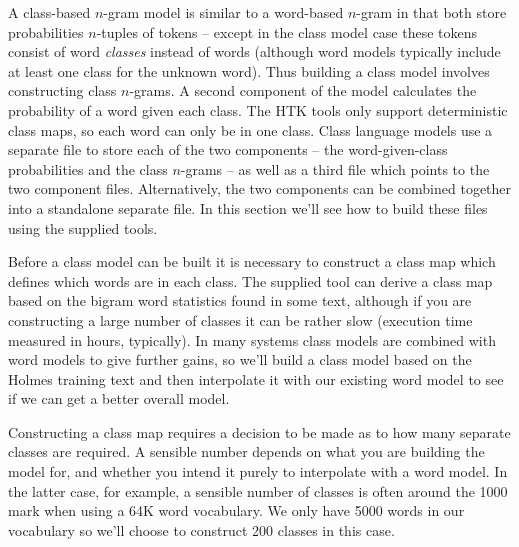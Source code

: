 A class-based $n$-gram model is similar to a word-based $n$-gram in
that both store probabilities $n$-tuples of tokens -- except in the
class model case these tokens consist of word {\it classes} instead of
words (although word models typically include at least one class for
the unknown word).  Thus building a class model involves constructing
class $n$-grams.  A second component of the model calculates the
probability of a word given each class.  The HTK tools only support
deterministic class maps, so each word can only be in one class.
Class language models use a separate file to store each of the two
components -- the word-given-class probabilities and the class
$n$-grams -- as well as a third file which points to the two component
files.  Alternatively, the two components can be combined together
into a standalone separate file.  In this section we'll see how to
build these files using the supplied tools.

Before a class model can be built it is necessary to construct a class
map which defines which words are in each class.  The supplied
 tool can derive a class map based on the bigram word
statistics found in some text, although if you are constructing a
large number of classes it can be rather slow (execution time measured
in hours, typically).  In many systems class models are combined with
word models to give further gains, so we'll build a class model based
on the Holmes training text and then interpolate it with our existing
word model to see if we can get a better overall model.

Constructing a class map requires a decision to be made as to how many
separate classes are required.  A sensible number depends on what you
are building the model for, and whether you intend it purely to
interpolate with a word model.  In the latter case, for example, a
sensible number of classes is often around the 1000 mark when using a
64K word vocabulary.  We only have 5000 words in our vocabulary so
we'll choose to construct 200 classes in this case.

